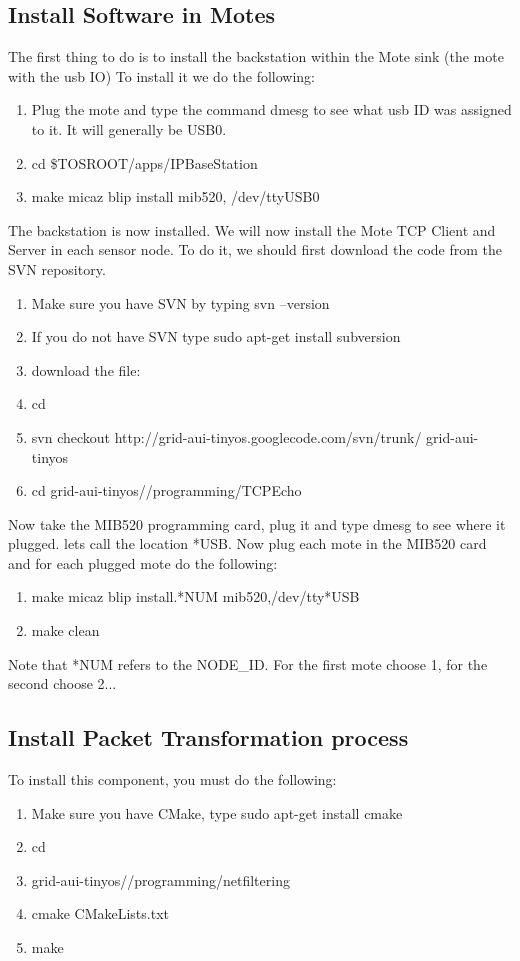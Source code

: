 \documentclass[oneside,12pt,a4paper,final]{book}
\begin{document}
\subsection{Install Software in Motes}
The first thing to do is to install the backstation within the Mote sink (the mote with the \gls{usb} IO) To install it we do the following:
\begin{enumerate}
\item Plug the mote and type the command dmesg to see what \gls{usb} ID was assigned to it. It will generally be USB0.
\item cd \$TOSROOT/apps/IPBaseStation
\item make micaz blip install  mib520, /dev/ttyUSB0
\end{enumerate}
The backstation is now installed. We will now install the Mote TCP Client and Server in each sensor node. To do it, we should first download the code from the SVN repository.
\begin{enumerate}
\item Make sure you have SVN by typing svn --version
\item If you do not have SVN type sudo apt-get install subversion
\item download the file:
\item cd
\item svn checkout http://grid-aui-tinyos.googlecode.com/svn/trunk/ grid-aui-tinyos
\item cd grid-aui-tinyos//programming/TCPEcho
\end{enumerate}
Now take the MIB520 programming card, plug it and type dmesg to see where it plugged. lets call the location *USB. Now plug each mote in the MIB520 card and for each plugged mote do the following:

\begin{enumerate}
\item  make micaz blip install.*NUM mib520,/dev/tty*USB
\item make clean
\end{enumerate}
Note that *NUM refers to the NODE\_ID. For the first mote choose 1, for the second choose 2...

\subsection{Install Packet Transformation process}
To install this component, you must do the following:
\begin{enumerate}
\item Make sure you have CMake, type sudo apt-get install cmake
\item cd
\item grid-aui-tinyos//programming/netfiltering
\item cmake CMakeLists.txt
\item make
\end{enumerate}
\end{document}
